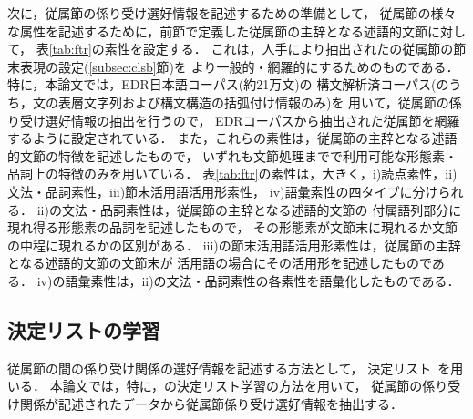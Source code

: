 次に，従属節の係り受け選好情報を記述するための準備として，
従属節の様々な属性を記述するために，前節で定義した従属節の主辞となる述語的文節に対して，
表\ref{tab:ftr}の素性を設定する．
これは，人手により抽出された\cite{SShirai95bj}の従属節の節末表現の設定(\ref{subsec:clsb}節)を
より一般的・網羅的にするためのものである．
特に，本論文では，EDR日本語コーパス\cite{EDR95aj-nlp}(約21万文)の
構文解析済コーパス(のうち，文の表層文字列および構文構造の括弧付け情報のみ)を
用いて，従属節の係り受け選好情報の抽出を行うので，
EDRコーパスから抽出された従属節を網羅するように設定されている．
また，これらの素性は，従属節の主辞となる述語的文節の特徴を記述したもので，
いずれも文節処理までで利用可能な形態素・品詞上の特徴のみを用いている．
表\ref{tab:ftr}の素性は，大きく，i)読点素性，ii)文法・品詞素性，iii)節末活用語活用形素性，
iv)語彙素性の四タイプに分けられる．
ii)の文法・品詞素性は，従属節の主辞となる述語的文節の
付属語列部分に現れ得る形態素の品詞を記述したもので，
その形態素が文節末に現れるか文節の中程に現れるかの区別がある．
iii)の節末活用語活用形素性は，従属節の主辞となる述語的文節の文節末が
活用語の場合にその活用形を記述したものである．
iv)の語彙素性は，ii)の文法・品詞素性の各素性を語彙化したものである．

\subsection{決定リストの学習}

従属節の間の係り受け関係の選好情報を記述する方法として，
決定リスト~\cite{Rivest87a,Yarowsky94a}を用いる．
本論文では，特に，\cite{Yarowsky94a}の決定リスト学習の方法を用いて，
従属節の係り受け関係が記述されたデータから従属節係り受け選好情報を抽出する．


